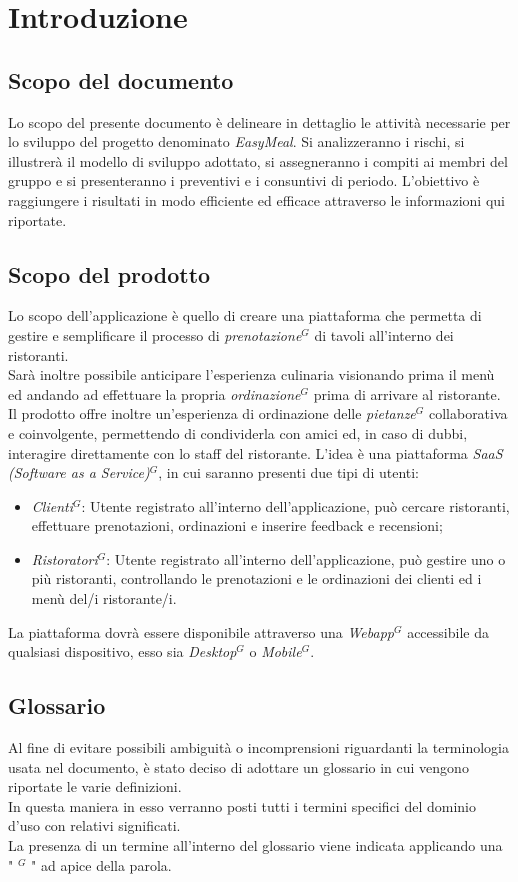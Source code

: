\section{Introduzione}
\subsection{Scopo del documento}
Lo scopo del presente documento è delineare in dettaglio le attività necessarie per lo sviluppo del progetto denominato \emph{EasyMeal}.
Si analizzeranno i rischi, si illustrerà il modello di sviluppo adottato, si assegneranno i compiti ai membri del gruppo e si presenteranno i preventivi e i consuntivi di periodo.
L'obiettivo è raggiungere i risultati in modo efficiente ed efficace attraverso le informazioni qui riportate.
\subsection{Scopo del prodotto}
Lo scopo dell'applicazione è quello di creare una piattaforma che permetta di gestire e semplificare
il processo di \emph{prenotazione}$^{G}$ di tavoli all'interno dei ristoranti. \\
Sarà inoltre possibile anticipare l'esperienza culinaria visionando prima il menù ed
andando ad effettuare la propria \emph{ordinazione}$^{G}$ prima di arrivare al ristorante. \\
Il prodotto offre inoltre un’esperienza di ordinazione delle \emph{pietanze}$^{G}$ collaborativa e coinvolgente,
permettendo di condividerla con amici ed, in caso di dubbi, interagire direttamente con lo staff del ristorante.
L’idea è una piattaforma \emph{SaaS (Software as a Service)}$^{G}$, in cui saranno presenti due tipi di utenti:
\begin{itemize}
    \item \emph{Clienti}$^{G}$: Utente registrato all’interno dell’applicazione, può cercare ristoranti, effettuare prenotazioni, ordinazioni e inserire feedback e recensioni;
    \item \emph{Ristoratori}$^{G}$: Utente registrato all’interno dell’applicazione, può gestire uno o più ristoranti, controllando le prenotazioni e le ordinazioni dei clienti ed i menù del/i ristorante/i.
\end{itemize}
La piattaforma dovrà essere disponibile attraverso una \emph{Webapp}$^{G}$ accessibile da qualsiasi dispositivo, esso sia \emph{Desktop}$^{G}$ o \emph{Mobile}$^{G}$.
\subsection{Glossario}
Al fine di evitare possibili ambiguità o incomprensioni riguardanti la terminologia usata nel documento, è stato deciso di adottare un glossario in cui vengono riportate le varie definizioni. \\
In questa maniera in esso verranno posti tutti i termini specifici del dominio d’uso con relativi significati. \\
La presenza di un termine all’interno del glossario viene indicata applicando una " $^{G}$ " ad apice della parola.
